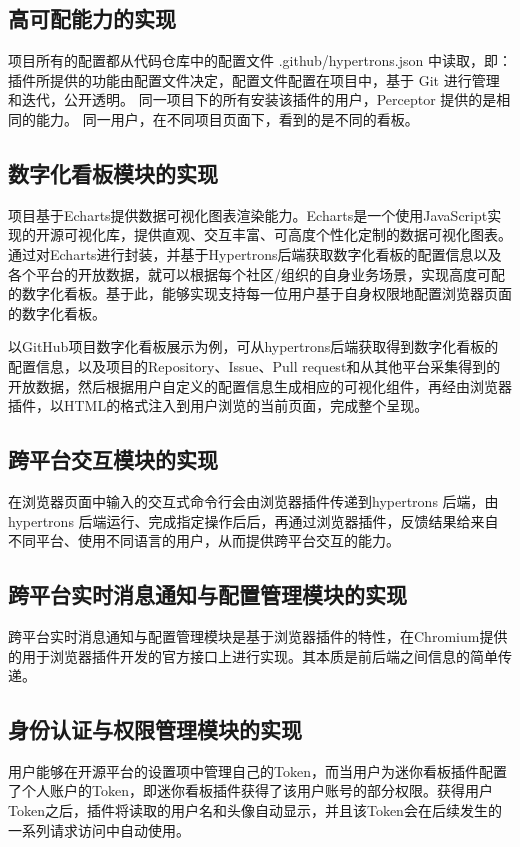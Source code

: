 \subsection{高可配能力的实现}
\par 项目所有的配置都从代码仓库中的配置文件 .github/hypertrons.json 中读取，即：
插件所提供的功能由配置文件决定，配置文件配置在项目中，基于 Git 进行管理和迭代，公开透明。
同一项目下的所有安装该插件的用户，Perceptor 提供的是相同的能力。
同一用户，在不同项目页面下，看到的是不同的看板。


\subsection{数字化看板模块的实现}
\par 项目基于Echarts提供数据可视化图表渲染能力。Echarts是一个使用JavaScript实现的开源可视化库，提供直观、交互丰富、可高度个性化定制的数据可视化图表。通过对Echarts进行封装，并基于Hypertrons后端获取数字化看板的配置信息以及各个平台的开放数据，就可以根据每个社区/组织的自身业务场景，实现高度可配的数字化看板。基于此，能够实现支持每一位用户基于自身权限地配置浏览器页面的数字化看板。
\par 以GitHub项目数字化看板展示为例，可从hypertrons后端获取得到数字化看板的配置信息，以及项目的Repository、Issue、Pull request和从其他平台采集得到的开放数据，然后根据用户自定义的配置信息生成相应的可视化组件，再经由浏览器插件，以HTML的格式注入到用户浏览的当前页面，完成整个呈现。



\subsection{跨平台交互模块的实现}
\par 在浏览器页面中输入的交互式命令行会由浏览器插件传递到hypertrons 后端，由hypertrons 后端运行、完成指定操作后后，再通过浏览器插件，反馈结果给来自不同平台、使用不同语言的用户，从而提供跨平台交互的能力。

\subsection{跨平台实时消息通知与配置管理模块的实现}
\par 跨平台实时消息通知与配置管理模块是基于浏览器插件的特性，在Chromium提供的用于浏览器插件开发的官方接口上进行实现。其本质是前后端之间信息的简单传递。

\subsection{身份认证与权限管理模块的实现}
\par 用户能够在开源平台的设置项中管理自己的Token，而当用户为迷你看板插件配置了个人账户的Token，即迷你看板插件获得了该用户账号的部分权限。获得用户Token之后，插件将读取的用户名和头像自动显示，并且该Token会在后续发生的一系列请求访问中自动使用。

